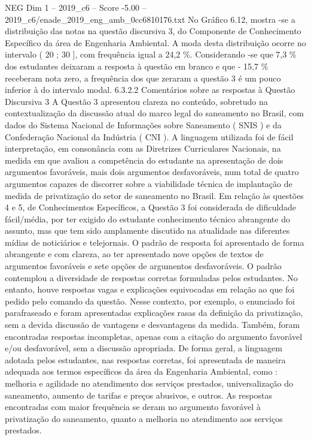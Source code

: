 \begin{textsample}{NEG Dim 1 – 2019\_c6 – Score -5.00 – 2019\_c6/enade\_2019\_eng\_amb\_0cc6810176.txt}
No Gráfico 6.12, mostra -se a distribuição das notas na questão discursiva 3, do Componente de Conhecimento Específico da área de Engenharia Ambiental.
A moda desta distribuição ocorre no intervalo ( 20 ; 30 ], com frequência igual a 24,2 \%.
Considerando -se que 7,3 \% dos estudantes deixaram a resposta à questão em branco e que - 15,7 \% receberam nota zero, a frequência dos que zeraram a questão 3 é um pouco inferior à do intervalo modal. 6.3.2.2 Comentários sobre as respostas à Questão Discursiva 3 A Questão 3 apresentou clareza no conteúdo, sobretudo na contextualização da discussão atual do marco legal do saneamento no Brasil, com dados do Sistema Nacional de Informações sobre Saneamento ( SNIS ) e da Confederação Nacional da Indústria ( CNI ).
A linguagem utilizada foi de fácil interpretação, em consonância com as Diretrizes Curriculares Nacionais, na medida em que avaliou a competência do estudante na apresentação de dois argumentos favoráveis, mais dois argumentos desfavoráveis, num total de quatro argumentos capazes de discorrer sobre a viabilidade técnica de implantação de medida de privatização do setor de saneamento no Brasil.
Em relação às questões 4 e 5, de Conhecimentos Específicos, a Questão 3 foi considerada de dificuldade fácil/média, por ter exigido do estudante conhecimento técnico abrangente do assunto, mas que tem sido amplamente discutido na atualidade nas diferentes mídias de noticiários e telejornais.
O padrão de resposta foi apresentado de forma abrangente e com clareza, ao ter apresentado nove opções de textos de argumentos favoráveis e sete opções de argumentos desfavoráveis.
O padrão contemplou a diversidade de respostas corretas formuladas pelos estudantes.
No entanto, houve respostas vagas e explicações equivocadas em relação ao que foi pedido pelo comando da questão.
Nesse contexto, por exemplo, o enunciado foi parafraseado e foram apresentadas explicações rasas da definição da privatização, sem a devida discussão de vantagens e desvantagens da medida.
Também, foram encontradas respostas incompletas, apenas com a citação do argumento favorável e/ou desfavorável, sem a discussão apropriada.
De forma geral, a linguagem adotada pelos estudantes, nas respostas corretas, foi apresentada de maneira adequada aos termos específicos da área da Engenharia Ambiental, como : melhoria e agilidade no atendimento dos serviços prestados, universalização do saneamento, aumento de tarifas e preços abusivos, e outros.
As respostas encontradas com maior frequência se deram no argumento favorável à privatização do saneamento, quanto a melhoria no atendimento aos serviços prestados.

\end{textsample}
